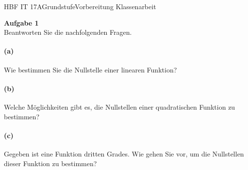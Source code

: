 \documentclass[oneside,openany,headings=optiontotoc,11pt,numbers=noenddot]{scrreprt}
\begin{document}
	\begin{worksheet}{HBF IT 17A}{Grundstufe}{Vorbereitung Klassenarbeit}
		\begin{framed}
			\noindent\normalsize
			\textbf{Aufgabe 1}\\
			Beantworten Sie die nachfolgenden Fragen.
			\paragraph{(a)} Wie bestimmen Sie die Nullstelle einer linearen Funktion?
			\paragraph{(b)} Welche Möglichkeiten gibt es, die Nullstellen einer quadratischen Funktion zu bestimmen?
			\paragraph{(c)} Gegeben ist eine Funktion dritten Grades. Wie gehen Sie vor, um die Nullstellen dieser Funktion zu bestimmen?

\end{framed}
\end{worksheet}
\end{document}
